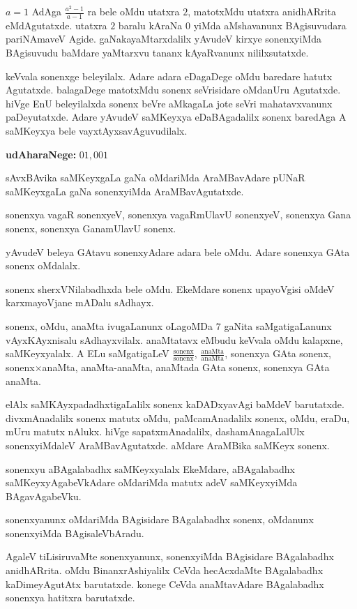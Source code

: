 $a=1$ AdAga $\frac{a^2-1}{a-1}$ ra bele oMdu utatxra $2$, matotxMdu utatxra anidhARrita eMdAgutatxde. utatxra $2$ baralu kAraNa $0$ yiMda aMshavanunx BAgisuvudara pari\-NAmaveV Agide. gaNakayaMtarxdalilx yAvudeV kirxye sonenxyiMda BAgisuvudu baMdare yaMtarxvu tananx kAyaRvanunx nililxsutatxde.

keVvala sonenxge beleyilalx. Adare adara eDagaDege oMdu baredare hatutx Agutatxde. balagaDege matotxMdu sonenx seVrisidare oMdanUru Agutatxde. hiVge EnU beleyilalxda sonenx beVre aMkagaLa jote seVri mahatavxvanunx paDeyutatxde. Adare yAvudeV saMKeyxya eDaBAgadalilx sonenx baredAga A saMKeyxya bele vayxtAyxsavAguvudilalx. 

\textbf{udAharaNege:} $01,001$

sAvxBAvika saMKeyxgaLa gaNa oMdariMda AraMBavAdare pUNaR saMKeyxgaLa gaNa sonenx\-yiMda AraMBavAgutatxde.

sonenxya vagaR sonenxyeV, sonenxya vagaRmUlavU sonenxyeV, sonenxya Gana sonenx, sonenxya GanamUlavU sonenx.

yAvudeV beleya GAtavu sonenxyAdare adara bele oMdu. Adare sonenxya GAta sonenx oMdalalx.

sonenx sherxVNilabadhxda bele oMdu. EkeMdare sonenx upayoVgisi oMdeV karxma\-yoVjane mADalu sAdhayx.

sonenx, oMdu, anaMta ivugaLanunx oLagoMDa $7$ gaNita saMgatigaLanunx vAyxKAyx\-nisalu sAdhayxvilalx. anaMtatavx eMbudu keVvala oMdu kalapxne, saMKeyxyalalx. A ELu saMgatigaLeV $\frac{\text{sonenx}}{\text{sonenx}}$, $\frac{\text{anaMta}}{\text{anaMta}}$, sonenxya GAta sonenx, sonenx$\times$anaMta, anaMta-anaMta, anaMtada GAta sonenx, sonenxya GAta anaMta.

elAlx saMKAyxpadadhxtigaLalilx sonenx kaDADxyavAgi baMdeV barutatxde. divxmAnadalilx sonenx matutx oMdu, paMcamAnadalilx sonenx, oMdu, eraDu, mUru matutx nAlukx. hiVge sapatxmAnadalilx, dashamAnagaLalUlx sonenxyiMdaleV AraMBavAgutatxde. aMdare AraMBika saMKeyx sonenx.

sonenxyu aBAgalabadhx saMKeyxyalalx EkeMdare, aBAgalabadhx saMKeyxyAgabeVkAdare oMdariMda matutx adeV saMKeyxyiMda BAgavAgabeVku.

sonenxyanunx oMdariMda BAgisidare BAgalabadhx sonenx, oMdanunx sonenxyiMda BAgisaleVbAradu.

AgaleV tiLisiruvaMte sonenxyanunx, sonenxyiMda BAgisidare BAgalabadhx anidhAR\-rita. oMdu BinanxrAshiyalilx CeVda hecAcxdaMte BAgalabadhx kaDimeyAgutAtx barutatxde. konege CeVda anaMtavAdare BAgalabadhx sonenxya hatitxra barutatxde.

